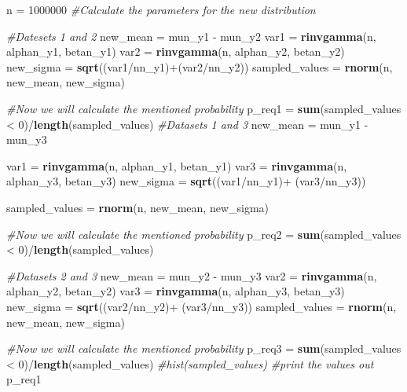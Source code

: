 \documentclass[]{article}
\newenvironment{Shaded}{\begin{snugshade}}{\end{snugshade}}
\newcommand{\KeywordTok}[1]{\textcolor[rgb]{0.13,0.29,0.53}{\textbf{{#1}}}}
\newcommand{\DecValTok}[1]{\textcolor[rgb]{0.00,0.00,0.81}{{#1}}}
\newcommand{\StringTok}[1]{\textcolor[rgb]{0.31,0.60,0.02}{{#1}}}
\newcommand{\CommentTok}[1]{\textcolor[rgb]{0.56,0.35,0.01}{\textit{{#1}}}}
\newcommand{\NormalTok}[1]{{#1}}
\begin{document}
\begin{Shaded}
\begin{Highlighting}[]
\NormalTok{n =}\StringTok{ }\DecValTok{1000000}
\CommentTok{#Calculate the parameters for the new distribution}

\CommentTok{#Datesets 1 and 2}
\NormalTok{new_mean =}\StringTok{ }\NormalTok{mun_y1 -}\StringTok{ }\NormalTok{mun_y2}
\NormalTok{var1 =}\StringTok{ }\KeywordTok{rinvgamma}\NormalTok{(n, alphan_y1, betan_y1)}
\NormalTok{var2 =}\StringTok{ }\KeywordTok{rinvgamma}\NormalTok{(n, alphan_y2, betan_y2)}
\NormalTok{new_sigma =}\StringTok{ }\KeywordTok{sqrt}\NormalTok{((var1/nn_y1)+(var2/nn_y2))}
\NormalTok{sampled_values =}\StringTok{ }\KeywordTok{rnorm}\NormalTok{(n, new_mean, new_sigma)}

\CommentTok{#Now we will calculate the mentioned probability}
\NormalTok{p_req1 =}\StringTok{ }\KeywordTok{sum}\NormalTok{(sampled_values <}\StringTok{ }\DecValTok{0}\NormalTok{)/}\KeywordTok{length}\NormalTok{(sampled_values)}
\CommentTok{#Datasets 1 and 3}
\NormalTok{new_mean =}\StringTok{ }\NormalTok{mun_y1 -}\StringTok{ }\NormalTok{mun_y3}

\NormalTok{var1 =}\StringTok{ }\KeywordTok{rinvgamma}\NormalTok{(n, alphan_y1, betan_y1)}
\NormalTok{var3 =}\StringTok{ }\KeywordTok{rinvgamma}\NormalTok{(n, alphan_y3, betan_y3)}
\NormalTok{new_sigma =}\StringTok{ }\KeywordTok{sqrt}\NormalTok{((var1/nn_y1)+}\StringTok{ }\NormalTok{(var3/nn_y3))}

\NormalTok{sampled_values =}\StringTok{ }\KeywordTok{rnorm}\NormalTok{(n, new_mean, new_sigma)}

\CommentTok{#Now we will calculate the mentioned probability}
\NormalTok{p_req2 =}\StringTok{ }\KeywordTok{sum}\NormalTok{(sampled_values <}\StringTok{ }\DecValTok{0}\NormalTok{)/}\KeywordTok{length}\NormalTok{(sampled_values)}

\CommentTok{#Datasets 2 and 3}
\NormalTok{new_mean =}\StringTok{ }\NormalTok{mun_y2 -}\StringTok{ }\NormalTok{mun_y3}
\NormalTok{var2 =}\StringTok{ }\KeywordTok{rinvgamma}\NormalTok{(n, alphan_y2, betan_y2)}
\NormalTok{var3 =}\StringTok{ }\KeywordTok{rinvgamma}\NormalTok{(n, alphan_y3, betan_y3)}
\NormalTok{new_sigma =}\StringTok{ }\KeywordTok{sqrt}\NormalTok{((var2/nn_y2)+}\StringTok{ }\NormalTok{(var3/nn_y3))}
\NormalTok{sampled_values =}\StringTok{ }\KeywordTok{rnorm}\NormalTok{(n, new_mean, new_sigma)}

\CommentTok{#Now we will calculate the mentioned probability}
\NormalTok{p_req3 =}\StringTok{ }\KeywordTok{sum}\NormalTok{(sampled_values <}\StringTok{ }\DecValTok{0}\NormalTok{)/}\KeywordTok{length}\NormalTok{(sampled_values)}
\CommentTok{#hist(sampled_values)}
\CommentTok{#print the values out}
\NormalTok{p_req1}
\end{Highlighting}
\end{Shaded}
\end{document}
